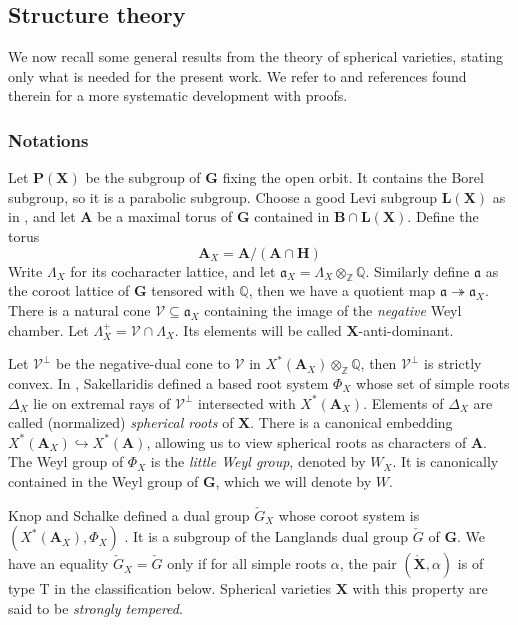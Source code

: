\documentclass{amsart}
\theoremstyle{definition}
\theoremstyle{remark}
\newcommand{\1}{\mathbf{1}}
\newcommand{\mb}[1]{\mathbf{#1}}
\newcommand{\Q}{\mathbb{Q}}
\newcommand{\sh}[1]{\mathcal{#1}}
\newcommand{\Z}{\mathbb{Z}}
\theoremstyle{definition}
\newcommand{\bH}{\mathbf{H}}
\newcommand{\bG}{\mathbf{G}}
\begin{document}
\subsection{Structure theory}\label{sec:Structure}
We now recall some general results from the theory of spherical varieties, stating only what is needed for the present work. We refer to \cite{SakSpherical,SVSpherical} and references found therein for a more systematic development with proofs.

\subsubsection{Notations}
Let $\mb{P}(\mb{X})$ be the subgroup of $\mb{G}$ fixing the open orbit. It contains the Borel subgroup, so it is a parabolic subgroup. Choose a good Levi subgroup $\mb{L}(\mb{X})$ as in \cite[\S 2.1]{SakSpherical}, and let $\mb{A}$ be a maximal torus of $\bG$ contained in $\mb{B}\cap\mb{L}(\mb{X})$. Define the torus
\[
  \mb{A}_X=\mb{A}/(\mb{A}\cap\bH)
\]
Write $\Lambda_X$ for its cocharacter lattice, and let $\mathfrak{a}_X=\Lambda_X\otimes_\Z\Q$. Similarly define $\mathfrak{a}$ as the coroot lattice of $\mb{G}$ tensored with $\Q$, then we have a quotient map $\mathfrak{a}\twoheadrightarrow\mathfrak{a}_X$. There is a natural cone $\sh{V}\subseteq\mathfrak{a}_X$ containing the image of the \emph{negative} Weyl chamber. Let $\Lambda_X^+=\sh{V}\cap\Lambda_X$. Its elements will be called $\mb{X}$-anti-dominant.

Let $\sh{V}^\perp$ be the negative-dual cone to $\sh{V}$ in $X^*(\mb{A}_X)\otimes_\Z\Q$, then $\sh{V}^\perp$ is strictly convex. %
In \cite[\S 6.1]{SakSpherical}, Sakellaridis defined a based root system $\Phi_X$ whose set of simple roots $\Delta_X$ lie on extremal rays of $\sh{V}^\perp$ intersected with $X^*(\mb{A}_X)$. Elements of $\Delta_X$ are called (normalized) \emph{spherical roots} of $\mb{X}$. There is a canonical embedding $X^*(\mb{A}_X)\hookrightarrow X^*(\mb{A})$, allowing us to view spherical roots as characters of $\mb{A}$. The Weyl group of $\Phi_X$ is the \emph{little Weyl group}, denoted by $W_X$. It is canonically contained in the Weyl group of $\mb{G}$, which we will denote by $W$.

Knop and Schalke defined a dual group $\check{G}_X$ whose coroot system is $(X^*(\mb{A}_X),\Phi_X)$ \cite{KnopSchalke}. It is a subgroup of the Langlands dual group $\check{G}$ of $\mb{G}$. We have an equality $\check{G}_X=\check{G}$ only if for all simple roots $\alpha$, the pair $(\mathring{\mb{X}},\alpha)$ is of type T in the classification below. Spherical varieties $\mb{X}$ with this property are said to be \emph{strongly tempered}.
\end{document}
